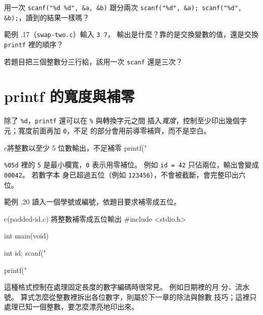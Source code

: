 
\begin{drills}[label=drills:basic-multi-read]
\item 用一次 \texttt{scanf("\%d \%d", \&a, \&b)} 跟分兩次
\texttt{scanf("\%d", \&a); scanf("\%d", \&b);}，讀到的結果一樣嗎？
\item 範例 \thechapter.17（\texttt{swap-two.c}）輸入 \texttt{3 7}，
輸出是什麼？靠的是交換變數的值，還是交換 \texttt{printf} 裡的順序？
\item 若題目把三個整數分三行給，該用一次 \texttt{scanf} 還是三次？
\end{drills}

\section{printf 的寬度與補零}
\label{sec:basic-width-padding}

除了 \texttt{\%d}，\texttt{printf} 還可以在 \texttt{\%} 與轉換字元之間
插入\emph{寬度}，控制至少印出幾個字元；寬度前面再加 \texttt{0}，不足
的部分會用前導零補齊，而不是空白。

\begin{code}{c}{將整數以至少 5 位數輸出，不足補零}
printf("%
\end{code}

\texttt{\%05d} 裡的 \texttt{5} 是最小欄寬，\texttt{0} 表示用零補位。
例如 \texttt{id = 42} 只佔兩位，輸出會變成 \texttt{00042}。 若數字本
身已超過五位（例如 \texttt{123456}），不會被截斷，會完整印出六位。

範例 \thechapter.20 讀入一個學號或編號，依題目要求補零成五位。

\begin{example}{c}{(padded-id.c) 將整數補零成五位輸出}
#include <stdio.h>

int main(void) {
    int id;
    scanf("%

    printf("%
}
\end{example}


這種格式控制在處理固定長度的數字編碼時很常見。 例如日期裡的月
分、流水號。 算式怎麼從整數裡拆出各位數字，則屬於下一章的除法與餘數
技巧；這裡只處理已知一個整數，要怎麼漂亮地印出來。

